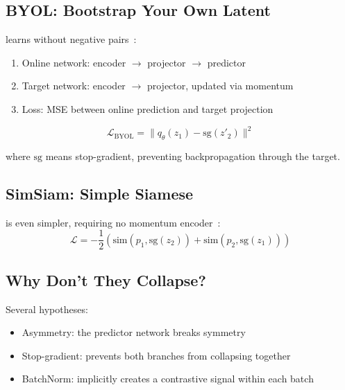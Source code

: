 
\subsection{BYOL: Bootstrap Your Own Latent}

 learns without negative pairs~\cite{Grill2020BYOL}:
\begin{enumerate}
    \item Online network: encoder $\to$ projector $\to$ predictor
    \item Target network: encoder $\to$ projector, updated via momentum
    \item Loss: MSE between online prediction and target projection
\end{enumerate}

\begin{equation}
    \mathcal{L}_{\text{BYOL}} = \|q_\theta(z_1) - \text{sg}(z'_2)\|^2
\end{equation}

where $\text{sg}$ means stop-gradient, preventing backpropagation through the target.

\subsection{SimSiam: Simple Siamese}

 is even simpler, requiring no momentum encoder~\cite{Chen2021SimSiam}:
\begin{equation}
    \mathcal{L} = -\frac{1}{2} \left( \text{sim}(p_1, \text{sg}(z_2)) + \text{sim}(p_2, \text{sg}(z_1)) \right)
\end{equation}

\subsection{Why Don't They Collapse?}


Several hypotheses:
\begin{itemize}
    \item Asymmetry: the predictor network breaks symmetry
    \item Stop-gradient: prevents both branches from collapsing together
    \item BatchNorm: implicitly creates a contrastive signal within each batch
\end{itemize}



